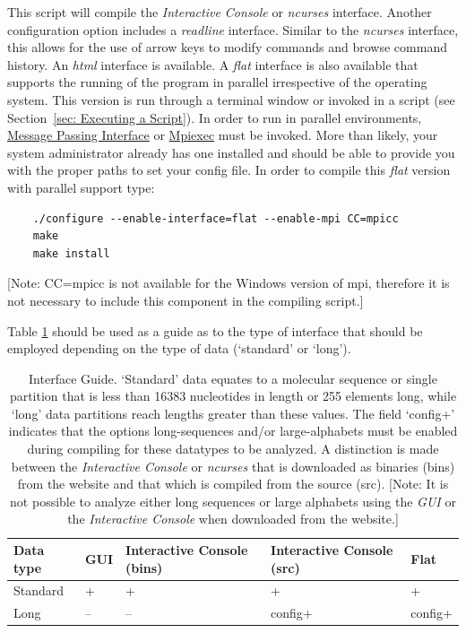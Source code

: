 This script will compile the \emph{Interactive Console} or \emph{ncurses} interface.  
Another configuration option includes a \emph{readline} interface.  Similar to the \emph{ncurses} interface, 
this allows for the use of arrow keys to modify commands and browse command history.  An \emph{html} interface is  
available. A \emph{flat} interface is also available that supports the running of the program in parallel irrespective of 
the operating system. This version is run through a terminal window or invoked in a script (see Section~\ref{sec: Executing a Script}). 
In order to run \poy in parallel environments, \href{http://www-unix.mcs.anl.gov/mpi/}{Message Passing Interface} 
or \href {https://www.osc.edu/~djohnson/mpiexec/} {Mpiexec} must be invoked. 
More than likely, your system administrator already has one installed and should be able to provide you with the 
proper paths to set your config file. In order to compile this \emph{flat} version with parallel support type: 
	\begin{verbatim}
	./configure --enable-interface=flat --enable-mpi CC=mpicc
	make
	make install
	\end{verbatim}
[Note: CC=mpicc is not available for the Windows version of mpi, therefore it is not necessary to include this 
component in the compiling script.] 

Table \ref{InterfaceGuide} should be used as a guide as to the type of interface that should be 
employed depending on the type of data (`standard' or `long').

\begin{table}[t] 
\small
\caption{Interface Guide. `Standard' data equates to a molecular sequence or single partition that is less than 16383 
nucleotides in length or 255 elements long, while `long' data partitions reach lengths greater than these values. The field 
`config+' indicates that the options long-sequences and/or large-alphabets must be enabled during compiling for these 
datatypes to be analyzed. A distinction is made between the \emph{Interactive Console} or \emph{ncurses} that is downloaded as binaries 
(bins) from the website and that which is compiled from the source (src). [Note: It is not possible to analyze either long sequences or
large alphabets using the \emph{GUI} or the \emph{Interactive Console} when downloaded from the \poy website.]}
\label{InterfaceGuide} 
\begin{center}
\renewcommand{\arraystretch}{1.5}
\begin{tabular}{p{2.0cm}  p{0.75cm}  p{2.4cm}  p{2.4cm}  p{1.0cm}} 
\hline
	Data type & GUI & Interactive Console (bins) & Interactive Console (src) & Flat \\
\hline
	Standard & + & + & + & + \\
	Long & -- & -- & config+ & config+\\
\hline
\end{tabular}
\end{center}
\end{table}

